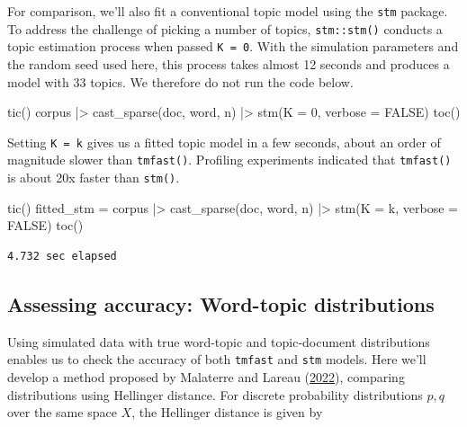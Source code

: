 \documentclass[
]{article}
\newenvironment{Shaded}{\begin{snugshade}}{\end{snugshade}}
\newcommand{\AttributeTok}[1]{\textcolor[rgb]{0.40,0.45,0.13}{#1}}
\newcommand{\ConstantTok}[1]{\textcolor[rgb]{0.56,0.35,0.01}{#1}}
\newcommand{\DecValTok}[1]{\textcolor[rgb]{0.68,0.00,0.00}{#1}}
\newcommand{\FunctionTok}[1]{\textcolor[rgb]{0.28,0.35,0.67}{#1}}
\newcommand{\NormalTok}[1]{\textcolor[rgb]{0.00,0.23,0.31}{#1}}
\newcommand{\OtherTok}[1]{\textcolor[rgb]{0.00,0.23,0.31}{#1}}
\newcommand{\SpecialCharTok}[1]{\textcolor[rgb]{0.37,0.37,0.37}{#1}}
\begin{document}
For comparison, we'll also fit a conventional topic model using the
\texttt{stm} package. To address the challenge of picking a number of
topics, \texttt{stm::stm()} conducts a topic estimation process when
passed \texttt{K\ =\ 0}. With the simulation parameters and the random
seed used here, this process takes almost 12 seconds and produces a
model with 33 topics. We therefore do not run the code below.

\begin{Shaded}
\begin{Highlighting}[]
\FunctionTok{tic}\NormalTok{()}
\NormalTok{corpus }\SpecialCharTok{|\textgreater{}} 
    \FunctionTok{cast\_sparse}\NormalTok{(doc, word, n) }\SpecialCharTok{|\textgreater{}} 
    \FunctionTok{stm}\NormalTok{(}\AttributeTok{K =} \DecValTok{0}\NormalTok{, }\AttributeTok{verbose =} \ConstantTok{FALSE}\NormalTok{)}
\FunctionTok{toc}\NormalTok{()}
\end{Highlighting}
\end{Shaded}

Setting \texttt{K\ =\ k} gives us a fitted topic model in a few seconds,
about an order of magnitude slower than \texttt{tmfast()}. Profiling
experiments indicated that \texttt{tmfast()} is about 20x faster than
\texttt{stm()}.

\begin{Shaded}
\begin{Highlighting}[]
\FunctionTok{tic}\NormalTok{()}
\NormalTok{fitted\_stm }\OtherTok{=}\NormalTok{ corpus }\SpecialCharTok{|\textgreater{}} 
    \FunctionTok{cast\_sparse}\NormalTok{(doc, word, n) }\SpecialCharTok{|\textgreater{}} 
    \FunctionTok{stm}\NormalTok{(}\AttributeTok{K =}\NormalTok{ k, }\AttributeTok{verbose =} \ConstantTok{FALSE}\NormalTok{)}
\FunctionTok{toc}\NormalTok{()}
\end{Highlighting}
\end{Shaded}

\begin{verbatim}
4.732 sec elapsed
\end{verbatim}

\hypertarget{assessing-accuracy-word-topic-distributions}{%
\subsection{Assessing accuracy: Word-topic
distributions}\label{assessing-accuracy-word-topic-distributions}}

Using simulated data with true word-topic and topic-document
distributions enables us to check the accuracy of both \texttt{tmfast}
and \texttt{stm} models. Here we'll develop a method proposed by
Malaterre and Lareau
(\protect\hyperlink{ref-MalaterreEarlyDaysContemporary2022}{2022}),
comparing distributions using Hellinger distance. For discrete
probability distributions \(p, q\) over the same space \(X\), the
Hellinger distance is given by
\end{document}
